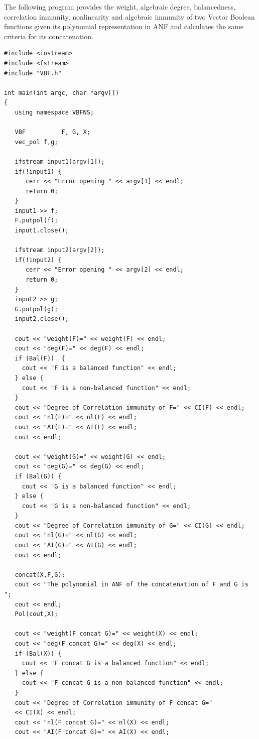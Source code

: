 \begin{example}
The following program provides the weight, algebraic degree, balancedness, correlation immunity, nonlinearity and algebraic immunity of two Vector Boolean functions given its polynomial representation in ANF and calculates the same criteria for its concatenation.

\begin{verbatim}
#include <iostream>
#include <fstream>
#include "VBF.h"

int main(int argc, char *argv[])
{
   using namespace VBFNS;

   VBF          F, G, X;
   vec_pol f,g;

   ifstream input1(argv[1]);
   if(!input1) {
      cerr << "Error opening " << argv[1] << endl;
      return 0;
   }
   input1 >> f;
   F.putpol(f);
   input1.close();

   ifstream input2(argv[2]);
   if(!input2) {
      cerr << "Error opening " << argv[2] << endl;
      return 0;
   }
   input2 >> g;
   G.putpol(g);
   input2.close();

   cout << "weight(F)=" << weight(F) << endl;
   cout << "deg(F)=" << deg(F) << endl;
   if (Bal(F))  {
     cout << "F is a balanced function" << endl;
   } else {
     cout << "F is a non-balanced function" << endl;
   }
   cout << "Degree of Correlation immunity of F=" << CI(F) << endl;
   cout << "nl(F)=" << nl(F) << endl;
   cout << "AI(F)=" << AI(F) << endl;
   cout << endl;

   cout << "weight(G)=" << weight(G) << endl;
   cout << "deg(G)=" << deg(G) << endl;
   if (Bal(G)) {
     cout << "G is a balanced function" << endl;
   } else {
     cout << "G is a non-balanced function" << endl;
   }
   cout << "Degree of Correlation immunity of G=" << CI(G) << endl;
   cout << "nl(G)=" << nl(G) << endl;
   cout << "AI(G)=" << AI(G) << endl;
   cout << endl;

   concat(X,F,G);
   cout << "The polynomial in ANF of the concatenation of F and G is ";
   cout << endl;
   Pol(cout,X);

   cout << "weight(F concat G)=" << weight(X) << endl;
   cout << "deg(F concat G)=" << deg(X) << endl;
   if (Bal(X)) {
     cout << "F concat G is a balanced function" << endl;
   } else {
     cout << "F concat G is a non-balanced function" << endl;
   }
   cout << "Degree of Correlation immunity of F concat G=" 
   << CI(X) << endl;
   cout << "nl(F concat G)=" << nl(X) << endl;
   cout << "AI(F concat G)=" << AI(X) << endl;


\end{verbatim}
\end{example}
